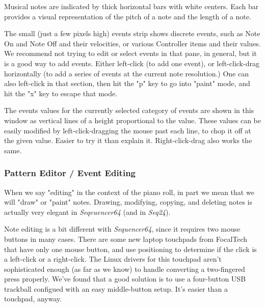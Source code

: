    Musical notes are indicated by thick horizontal bars with white
   centers.  Each bar provides
   a visual representation of the pitch of a note and the length of a note.

   The small (just a few pixels high) events strip shows discrete events,
   such as Note On and Note Off and their velocities, or various Controller
   items and their values.  We recommend not trying to edit or select events
   in that pane, in general, but it is a good way to add events.
   Either
   left-click (to add one event),
   or left-click-drag horizontally (to add a
   series of events at the current note resolution.)  One can also
   left-click in that section,
   then hit the "p" key to go into "paint" mode,
   and hit the "x" key to escape that mode.

   The events values for the currently selected category of events are shown
   in this window as vertical lines of a height proportional to the value.
   These values can be easily modified by
   left-click-dragging the
   mouse past each line, to chop it off at the given value.  Easier to try
   it than explain it.
   Right-click-drag also works the same.

\subsubsection{Pattern Editor / Event Editing}
\label{subsubsec:seq64_pattern_editor_event_editing}

   When we say "editing" in the context of the piano roll, in part we mean that
   we will "draw" or "paint" notes.
   Drawing, modifying, copying, and deleting
   notes is actually very elegant in \textsl{Seqeuencer64} (and in
   \textsl{Seq24}).

   Note editing is a bit different with \textsl{Sequencer64}, since it
   requires two mouse buttons in many cases.  There are some new
   laptop touchpads from FocalTech that have only one mouse button, and
   use positioning to determine if the click is a left-click or a right-click.
   The Linux drivers for this touchpad aren't sophisticated enough (as far
   as we know) to handle converting a two-fingered press properly.
   We've found that a good solution is to use a four-button USB trackball
   configued with an easy middle-button setup.
   It's easier than a touchpad, anyway.

